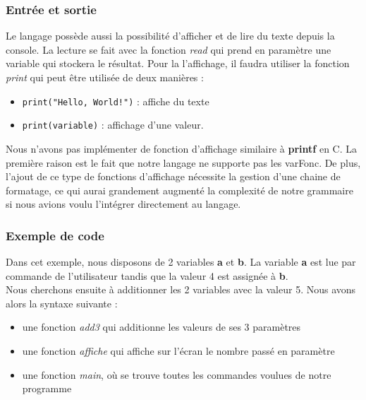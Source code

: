 \documentclass[a4paper]{article}%
\begin{document}
\subsubsection*{Entrée et sortie}

Le langage possède aussi la possibilité d'afficher et de lire du texte depuis la
console. La lecture se fait avec la fonction \textit{read} qui prend en
paramètre une variable qui stockera le résultat. Pour la l'affichage, il faudra
utiliser la fonction \textit{print} qui peut être utilisée de deux manières :

\begin{itemize}
  \item \lstinline{print("Hello, World!")} : affiche du texte
  \item \lstinline{print(variable)} : affichage d'une valeur.
\end{itemize}

Nous n'avons pas implémenter de fonction d'affichage similaire à \textbf{printf}
en C. La première raison est le fait que notre langage ne supporte pas les
\gls{varFonc}. De plus, l'ajout de ce type de fonctions d'affichage nécessite la
gestion d'une chaine de formatage, ce qui aurai grandement augmenté la
complexité de notre grammaire si nous avions voulu l'intégrer directement au
langage.

\subsubsection*{Exemple de code}

Dans cet exemple, nous disposons de 2 variables \textbf{a} et \textbf{b}. La
variable \textbf{a} est lue par commande de l'utilisateur tandis que la valeur 4
est assignée à \textbf{b}.\\
Nous cherchons ensuite à additionner les 2 variables avec la valeur 5. Nous avons alors la syntaxe suivante :\\

\begin{itemize}
  \item une fonction \textit{add3} qui additionne les valeurs de ses 3 paramètres\\
  \item une fonction \textit{affiche} qui affiche sur l'écran le nombre passé en paramètre\\
  \item une fonction \textit{main}, où se trouve toutes les commandes voulues de notre programme\\
\end{itemize}
\end{document}
